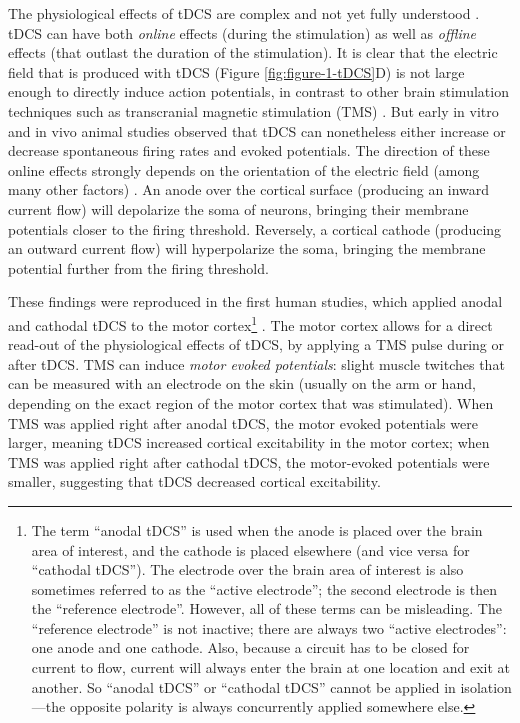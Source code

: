 \documentclass[11pt,]{memoir}
\let\rmarkdownfootnote\footnote%
\def\footnote{\protect\rmarkdownfootnote}
\begin{document}
The physiological effects of tDCS are complex and not yet fully understood \autocites{Jackson2016}{Liu2018}{Pelletier2015}{Stagg2018}. tDCS can have both \emph{online} effects (during the stimulation) as well as \emph{offline} effects (that outlast the duration of the stimulation). It is clear that the electric field that is produced with tDCS (Figure \ref{fig:figure-1-tDCS}D) is not large enough to directly induce action potentials, in contrast to other brain stimulation techniques such as transcranial magnetic stimulation (TMS) \autocite{Parkin2015}. But early in vitro \autocite{Terzuolo1956} and in vivo \autocites{Bindman1964}{Creutzfeldt1962}{Landau1964}{Purpura1965} animal studies observed that tDCS can nonetheless either increase or decrease spontaneous firing rates and evoked potentials. The direction of these online effects strongly depends on the orientation of the electric field (among many other factors) \autocite{Bikson2019}. An anode over the cortical surface (producing an inward current flow) will depolarize the soma of neurons, bringing their membrane potentials closer to the firing threshold. Reversely, a cortical cathode (producing an outward current flow) will hyperpolarize the soma, bringing the membrane potential further from the firing threshold.

These findings were reproduced in the first human studies, which applied anodal and cathodal tDCS to the motor cortex\footnote{The term ``anodal tDCS'' is used when the anode is placed over the brain area of interest, and the cathode is placed elsewhere (and vice versa for ``cathodal tDCS''). The electrode over the brain area of interest is also sometimes referred to as the ``active electrode''; the second electrode is then the ``reference electrode''. However, all of these terms can be misleading. The ``reference electrode'' is not inactive; there are always two ``active electrodes'': one anode and one cathode. Also, because a circuit has to be closed for current to flow, current will always enter the brain at one location and exit at another. So ``anodal tDCS'' or ``cathodal tDCS'' cannot be applied in isolation---the opposite polarity is always concurrently applied somewhere else.} \autocites{Nitsche2000}{Nitsche2001}. The motor cortex allows for a direct read-out of the physiological effects of tDCS, by applying a TMS pulse during or after tDCS. TMS can induce \emph{motor evoked potentials}: slight muscle twitches that can be measured with an electrode on the skin (usually on the arm or hand, depending on the exact region of the motor cortex that was stimulated). When TMS was applied right after anodal tDCS, the motor evoked potentials were larger, meaning tDCS increased cortical excitability in the motor cortex; when TMS was applied right after cathodal tDCS, the motor-evoked potentials were smaller, suggesting that tDCS decreased cortical excitability.
\end{document}
